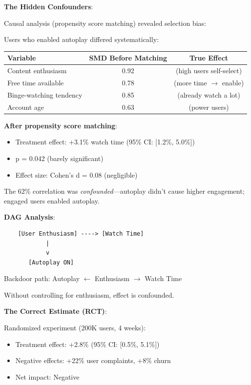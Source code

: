 \textbf{The Hidden Confounders}:

Causal analysis (propensity score matching) revealed selection bias:

Users who enabled autoplay differed systematically:

\begin{center}
\begin{tabular}{lcc}
\hline
\textbf{Variable} & \textbf{SMD Before Matching} & \textbf{True Effect} \\
\hline
Content enthusiasm & 0.92 & (high users self-select) \\
Free time available & 0.78 & (more time $\rightarrow$ enable) \\
Binge-watching tendency & 0.85 & (already watch a lot) \\
Account age & 0.63 & (power users) \\
\hline
\end{tabular}
\end{center}

\textbf{After propensity score matching}:

\begin{itemize}
    \item Treatment effect: +3.1\% watch time (95\% CI: [1.2\%, 5.0\%])
    \item p = 0.042 (barely significant)
    \item Effect size: Cohen's d = 0.08 (negligible)
\end{itemize}

The 62\% correlation was \textit{confounded}---autoplay didn't cause higher engagement; engaged users enabled autoplay.

\textbf{DAG Analysis}:

\begin{center}
\begin{verbatim}
    [User Enthusiasm] ----> [Watch Time]
            |
            v
       [Autoplay ON]
\end{verbatim}
\end{center}

Backdoor path: Autoplay $\leftarrow$ Enthusiasm $\rightarrow$ Watch Time

Without controlling for enthusiasm, effect is confounded.

\textbf{The Correct Estimate (RCT)}:

Randomized experiment (200K users, 4 weeks):
\begin{itemize}
    \item Treatment effect: +2.8\% (95\% CI: [0.5\%, 5.1\%])
    \item Negative effects: +22\% user complaints, +8\% churn
    \item Net impact: Negative
\end{itemize}

